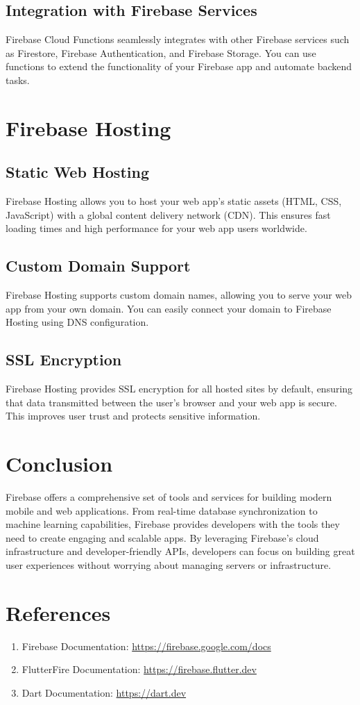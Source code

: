 \documentclass[12pt]{article}
\begin{document}
\subsection{Integration with Firebase Services}
Firebase Cloud Functions seamlessly integrates with other Firebase services such as Firestore, Firebase Authentication, and Firebase Storage. You can use functions to extend the functionality of your Firebase app and automate backend tasks.

\section{Firebase Hosting}

\subsection{Static Web Hosting}
Firebase Hosting allows you to host your web app's static assets (HTML, CSS, JavaScript) with a global content delivery network (CDN). This ensures fast loading times and high performance for your web app users worldwide.

\subsection{Custom Domain Support}
Firebase Hosting supports custom domain names, allowing you to serve your web app from your own domain. You can easily connect your domain to Firebase Hosting using DNS configuration.

\subsection{SSL Encryption}
Firebase Hosting provides SSL encryption for all hosted sites by default, ensuring that data transmitted between the user's browser and your web app is secure. This improves user trust and protects sensitive information.

\section{Conclusion}
Firebase offers a comprehensive set of tools and services for building modern mobile and web applications. From real-time database synchronization to machine learning capabilities, Firebase provides developers with the tools they need to create engaging and scalable apps. By leveraging Firebase's cloud infrastructure and developer-friendly APIs, developers can focus on building great user experiences without worrying about managing servers or infrastructure.

\section{References}
\begin{enumerate}
\item Firebase Documentation: \url{https://firebase.google.com/docs}
\item FlutterFire Documentation: \url{https://firebase.flutter.dev}
\item Dart Documentation: \url{https://dart.dev}
\end{enumerate}
\end{document}
